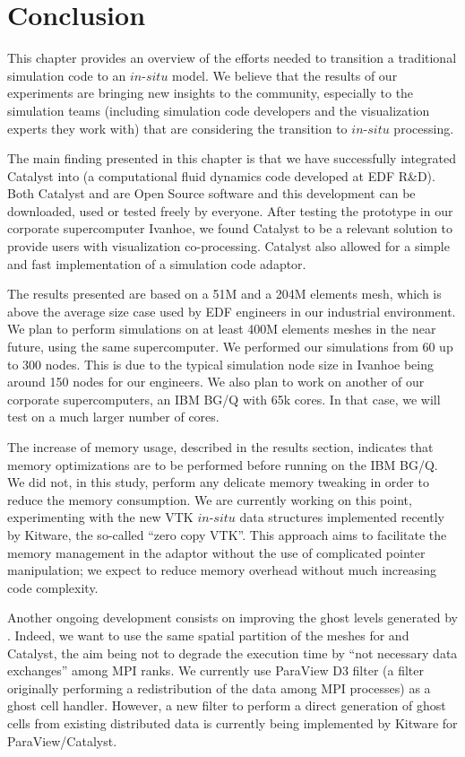 \section{Conclusion}
\label{sec:conclusion}

This chapter provides an overview of the efforts needed to transition
a traditional simulation code to an $in$-$situ$ model.  We believe that the
results of our experiments are bringing new insights to the
community, especially to the simulation teams (including simulation code
developers and the visualization experts they work with) that are
considering the transition to $in$-$situ$ processing.

The main finding presented in this chapter is that we have successfully
integrated Catalyst into \CS (a computational fluid dynamics code
developed at EDF R\&D). Both Catalyst and \CS are Open Source software
and this development can be downloaded, used or tested freely by everyone. After
testing the prototype in our corporate supercomputer Ivanhoe, we found Catalyst to
be a relevant solution to provide \CS users with visualization
co-processing. Catalyst also allowed for a simple and fast implementation of a simulation code
adaptor.

The results presented are based on a 51M and a 204M elements mesh, which is
above the average size case used by EDF engineers in our industrial environment.
We plan to perform simulations on at least 400M elements meshes in the near
future, using the same supercomputer. We performed our simulations from 60 up to
300 nodes. This is due to the typical simulation node size in Ivanhoe being around 150 nodes for our 
engineers. We also plan to work on another of our corporate supercomputers, an
IBM BG/Q with 65k cores. In that case, we will test on a much larger number of
cores.

The increase of memory usage, described in the results section, indicates that
memory optimizations are to be performed before running on the IBM BG/Q. We did
not, in this study, perform any delicate memory tweaking in order to reduce the
memory consumption. We are currently working on this point, experimenting with
the new VTK $in$-$situ$ data structures implemented recently by Kitware, the
so-called ``zero copy VTK''. This approach aims to facilitate the memory
management in the adaptor without the use of complicated pointer manipulation;
we expect to reduce memory overhead without much increasing code complexity.

Another ongoing development consists on improving the ghost levels
generated by \CS. Indeed, we want to use the same spatial partition of
the meshes for \CS and Catalyst, the aim being not to degrade the
execution time by “not necessary data exchanges” among MPI ranks. We currently
use ParaView D3 filter (a filter originally performing a redistribution of the
data among MPI processes) as a ghost cell handler. However, a new filter to perform 
a direct generation of ghost cells from existing distributed data is currently
being implemented by Kitware for ParaView/Catalyst. 

